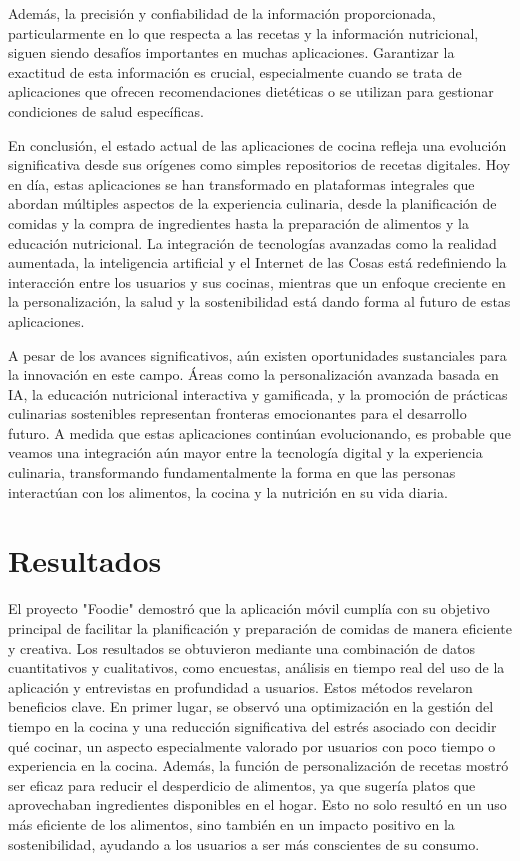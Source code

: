 \documentclass[a4paper,12pt]{article}
\begin{document}
Además, la precisión y confiabilidad de la información proporcionada, particularmente en lo que respecta a las recetas y la información nutricional, siguen siendo desafíos importantes en muchas aplicaciones. Garantizar la exactitud de esta información es crucial, especialmente cuando se trata de aplicaciones que ofrecen recomendaciones dietéticas o se utilizan para gestionar condiciones de salud específicas.

En conclusión, el estado actual de las aplicaciones de cocina refleja una evolución significativa desde sus orígenes como simples repositorios de recetas digitales. Hoy en día, estas aplicaciones se han transformado en plataformas integrales que abordan múltiples aspectos de la experiencia culinaria, desde la planificación de comidas y la compra de ingredientes hasta la preparación de alimentos y la educación nutricional. La integración de tecnologías avanzadas como la realidad aumentada, la inteligencia artificial y el Internet de las Cosas está redefiniendo la interacción entre los usuarios y sus cocinas, mientras que un enfoque creciente en la personalización, la salud y la sostenibilidad está dando forma al futuro de estas aplicaciones.

A pesar de los avances significativos, aún existen oportunidades sustanciales para la innovación en este campo. Áreas como la personalización avanzada basada en IA, la educación nutricional interactiva y gamificada, y la promoción de prácticas culinarias sostenibles representan fronteras emocionantes para el desarrollo futuro. A medida que estas aplicaciones continúan evolucionando, es probable que veamos una integración aún mayor entre la tecnología digital y la experiencia culinaria, transformando fundamentalmente la forma en que las personas interactúan con los alimentos, la cocina y la nutrición en su vida diaria.

\section*{Resultados}
El proyecto "Foodie" demostró que la aplicación móvil cumplía con su objetivo principal de facilitar la planificación y preparación de comidas de manera eficiente y creativa. Los resultados se obtuvieron mediante una combinación de datos cuantitativos y cualitativos, como encuestas, análisis en tiempo real del uso de la aplicación y entrevistas en profundidad a usuarios. Estos métodos revelaron beneficios clave. En primer lugar, se observó una optimización en la gestión del tiempo en la cocina y una reducción significativa del estrés asociado con decidir qué cocinar, un aspecto especialmente valorado por usuarios con poco tiempo o experiencia en la cocina. Además, la función de personalización de recetas mostró ser eficaz para reducir el desperdicio de alimentos, ya que sugería platos que aprovechaban ingredientes disponibles en el hogar. Esto no solo resultó en un uso más eficiente de los alimentos, sino también en un impacto positivo en la sostenibilidad, ayudando a los usuarios a ser más conscientes de su consumo.
\end{document}
